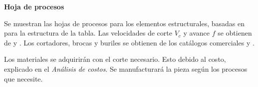 \textbf{Hoja de procesos}

Se muestran las hojas de procesos para los elementos estructurales, basadas en \cite{Diego} para la estructura de la tabla. Las velocidades de corte $ V_{c} $ y avance $ f $ se obtienen de \cite{Book} y \cite{ProcessP}. Los cortadores, brocas y buriles se obtienen de los catálogos comerciales \cite{Broca} y \cite{Fresa}.

Los materiales se adquirirán con el corte necesario. Esto debido al costo, explicado en el \textit{Análisis de costos}. Se manufacturará la pieza según los procesos que necesite.

\newpage


